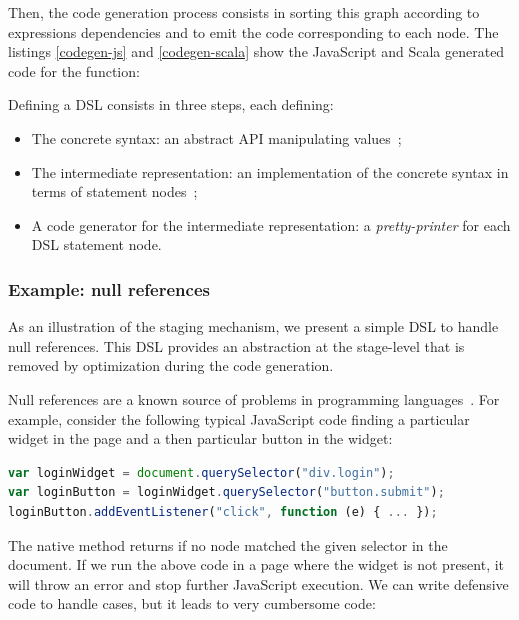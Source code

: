 \documentclass[runningheads,a4paper]{llncs}
\begin{document}
Then, the code generation process consists in sorting this graph according to expressions dependencies and to emit
the code corresponding to each node. The listings \ref{codegen-js} and \ref{codegen-scala} show the JavaScript and
Scala generated code for the  function:
\begin{multicols}{2}


\end{multicols}

Defining a DSL consists in three steps, each defining:

\begin{itemize}
\item The concrete syntax: an abstract API manipulating  values~;
\item The intermediate representation: an implementation of the concrete syntax in terms of statement nodes~;
\item A code generator for the intermediate representation: a \emph{pretty-printer} for each DSL statement node.
\end{itemize}

\subsubsection{Example: null references}

As an illustration of the staging mechanism, we present a simple DSL to handle null references. This DSL provides an
abstraction at the stage-level that is removed by optimization during the code generation.

Null references are a known source of problems in programming languages~\cite{Hoare09_Null,Nanda09_Null}. For
example, consider the following typical JavaScript code finding a particular widget in the page and a then particular
button in the widget:

\begin{lstlisting}[language=JavaScript,label=null-unsafe,caption=Unsafe code]
var loginWidget = document.querySelector("div.login");
var loginButton = loginWidget.querySelector("button.submit");
loginButton.addEventListener("click", function (e) { ... });
\end{lstlisting}

The native  method returns  if no node matched the given selector in the document. If
we run the above code in a page where the widget is not present, it will throw an error and stop further JavaScript
execution. We can write defensive code to handle  cases, but it leads to very cumbersome code:
\end{document}
